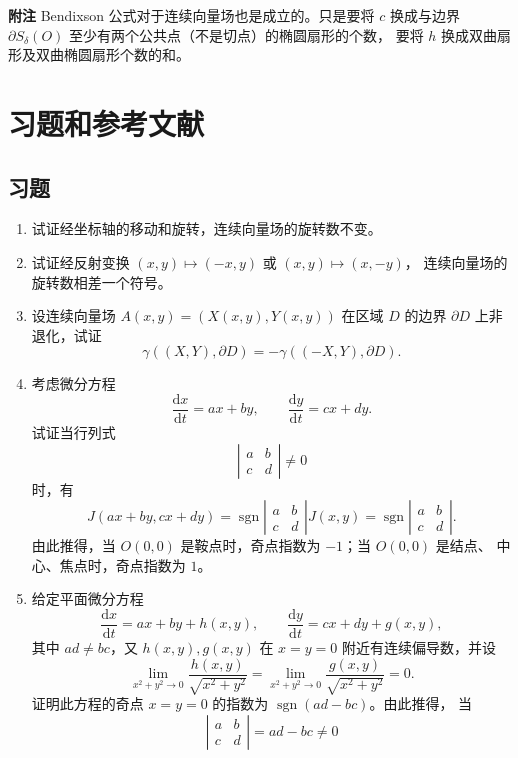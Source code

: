 \noindent\textbf{附注}\quad
Bendixson 公式对于连续向量场也是成立的。只是要将 $c$ 换成与边界
$\partial S_\delta(O)$ 至少有两个公共点（不是切点）的椭圆扇形的个数，
要将 $h$ 换成双曲扇形及双曲椭圆扇形个数的和。

\section*{习题和参考文献}
\subsection*{习题}

\begin{enumerate}
\item 试证经坐标轴的移动和旋转，连续向量场的旋转数不变。
\item 试证经反射变换 $(x,y)\mapsto(-x,y)$ 或 $(x,y)\mapsto(x,-y)$，
连续向量场的旋转数相差一个符号。
\item 设连续向量场 $A(x,y)=(X(x,y),Y(x,y))$ 在区域 $D$ 的边界
$\partial D$ 上非退化，试证
\[
\gamma((X,Y),\partial D)=-\gamma((-X,Y),\partial D).
\]
\item 考虑微分方程
\[
\dfrac{\mathrm{d}x}{\mathrm{d}t}=ax+by,\qquad
\dfrac{\mathrm{d}y}{\mathrm{d}t}=cx+dy.
\]
试证当行列式
\[
\left|\begin{matrix}a&b\\c&d\end{matrix}\right|\ne0
\]
时，有
\[
J(ax+by,cx+dy)
=\operatorname{sgn}\left|\begin{matrix}a&b\\c&d\end{matrix}\right|J(x,y)
=\operatorname{sgn}\left|\begin{matrix}a&b\\c&d\end{matrix}\right|.
\]
由此推得，当 $O(0,0)$ 是鞍点时，奇点指数为 $-1$；当 $O(0,0)$ 是结点、
中心、焦点时，奇点指数为 $1$。
\item 给定平面微分方程
\[
\dfrac{\mathrm{d}x}{\mathrm{d}t}=ax+by+h(x,y),\qquad
\dfrac{\mathrm{d}y}{\mathrm{d}t}=cx+dy+g(x,y),
\]
其中 $ad\ne bc$，又 $h(x,y),g(x,y)$ 在 $x=y=0$ 附近有连续偏导数，并设
\[
\lim_{x^2+y^2\to0}\dfrac{h(x,y)}{\sqrt{x^2+y^2}}
=\lim_{x^2+y^2\to0}\dfrac{g(x,y)}{\sqrt{x^2+y^2}}=0.
\]
证明此方程的奇点 $x=y=0$ 的指数为 $\operatorname{sgn}(ad-bc)$。由此推得，
当
\[
\left|\begin{matrix}a&b\\c&d\end{matrix}\right|=ad-bc\ne0
\]
\end{enumerate}
